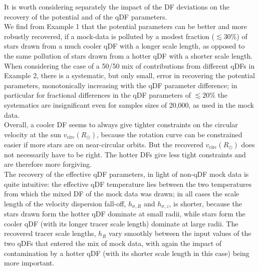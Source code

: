 It is worth considering separately the impact of the DF deviations on the recovery of the potential and of the qDF parameters. 
\\We find from Example 1 that the potential parameters can be better and more robustly recovered, if a mock-data \MAP is polluted by a modest fraction ($\lesssim 30\%$) of stars drawn from a much cooler qDF with a longer scale length, as opposed to the same pollution of stars drawn from a hotter qDF with a shorter scale length. 
\\When considering the case of a 50/50 mix of contributions from different qDFs in Example 2, there is a systematic, but only small, error in recovering the potential parameters, monotonically increasing with the qDF parameter difference; in particular for fractional differences in the qDF parameters of $\lesssim 20\%$ the systematics are insignificant even for samples sizes of 20,000, as used in the mock data. 
\\Overall, a cooler DF seems to always give tighter constraints on the circular velocity at the sun $v_\text{circ}(R_\odot)$, because the rotation curve can be constrained easier if more stars are on near-circular orbits. But the recovered $v_\text{circ}(R_\odot)$ does not necessarily have to be right. The hotter DFs give less tight constraints and are therefore more forgiving.
\\The recovery of the effective qDF parameters, in light of non-qDF mock data is quite intuitive: the effective qDF temperature lies between the two temperatures from which the mixed DF of the mock data was drawn; in all cases the scale length of the velocity dispersion fall-off, $h_{\sigma,R}$ and $h_{\sigma,z}$, is shorter, because the stars drawn form the hotter qDF dominate at small radii, while stars form the cooler qDF (with its longer tracer scale length) dominate at large radii. The recovered tracer scale lengths, $h_R$ vary smoothly between the input values of the two qDFs that entered the mix of mock data, with again the impact of contamination by a hotter qDF (with its shorter scale length in this case) being more important. 





